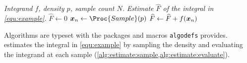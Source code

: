 \documentclass[10pt,twocolumn,letterpaper]{article}
\begin{document}
\begin{algorithm}[t]
	\caption{$(f, p, N)$}
	\label{alg:estimate}
	\begin{algorithmic}[1]
		\Require \textit{Integrand $f$, density $p$, sample count $N$.}
		\Ensure \textit{Estimate $\widehat{F}$ of the integral in \cref{equ:example}.}
		\State $\widehat{F} \gets 0$
			\ENDCOMMENT
			\State $\bm{x}_n \gets \Proc{Sample}(p)$ \label{alg:estimate:sample}
			\ENDCOMMENT
			\State $\widehat{F} \gets \widehat{F} + f \lparen\bm{x}_n\rparen$ \label{alg:estimate:evaluate}
		\ENDFORDO
		\RETURN[$\widehat{F} / N$]\ENDRETURN
	\end{algorithmic}
\end{algorithm}

Algorithms are typeset with the packages and macros \texttt{algodefs} provides.  estimates the integral in \cref{equ:example} by sampling the density and evaluating the integrand at each sample (\cref{alg:estimate:sample,alg:estimate:evaluate}).

{
	\small
	
	
}
\end{document}
